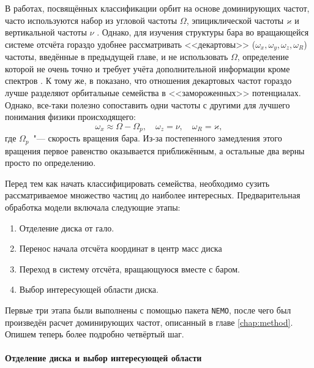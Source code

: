 \documentclass[tikz]{trlnotes}
\begin{document}
В работах, посвящённых классификации орбит на основе доминирующих частот, часто используются набор из угловой
частоты $Ω$, эпициклической частоты $ϰ$ и вертикальной частоты $ν$
\citep{athanassoula2002a,ceverino2007,voglis2007}. Однако, для изучения структуры бара во вращающейся системе
отсчёта гораздо удобнее рассматривать <<декартовы>> ($ω_x, ω_y, ω_z, ω_R$) частоты, введённые в предыдущей главе, и не использовать $Ω$, определение которой не очень точно и требует учёта дополнительной информации кроме спектров
\citep{athanassoula2002,gajda2016}. К тому же, в \citet{valluri2016} показано, что отношения декартовых частот
гораздо лучше разделяют орбитальные семейства в <<замороженных>> потенциалах. 
Однако, все-таки полезно сопоставить одни частоты с другими для лучшего понимания физики
происходящего: 
\[
  ω_x \approx Ω - Ω_p, \quad ω_z = ν, \quad ω_R = ϰ,
\]
где $Ω_p$~"--- скорость вращения бара. Из-за постепенного замедления этого вращения первое равенство
оказывается приближённым, а остальные два верны просто по определению.

Перед тем как начать классифицировать семейства, необходимо сузить рассматриваемое множество частиц до наиболее
интересных. Предварительная обработка модели включала следующие этапы:
\begin{enumerate}
  \item Отделение диска от гало. 
  \item Перенос начала отсчёта координат в центр масс диска
  \item Переход в систему отсчёта, вращающуюся вместе с баром.
  \item Выбор интересующей области диска.
\end{enumerate}
Первые три этапа были выполнены с помощью пакета \texttt{NEMO}, после чего был произведён расчет доминирующих
частот, описанный в главе \ref{chap:method}. Опишем теперь более подробно четвёртый шаг.
\paragraph{Отделение диска и выбор интересующей области}
\end{document}
